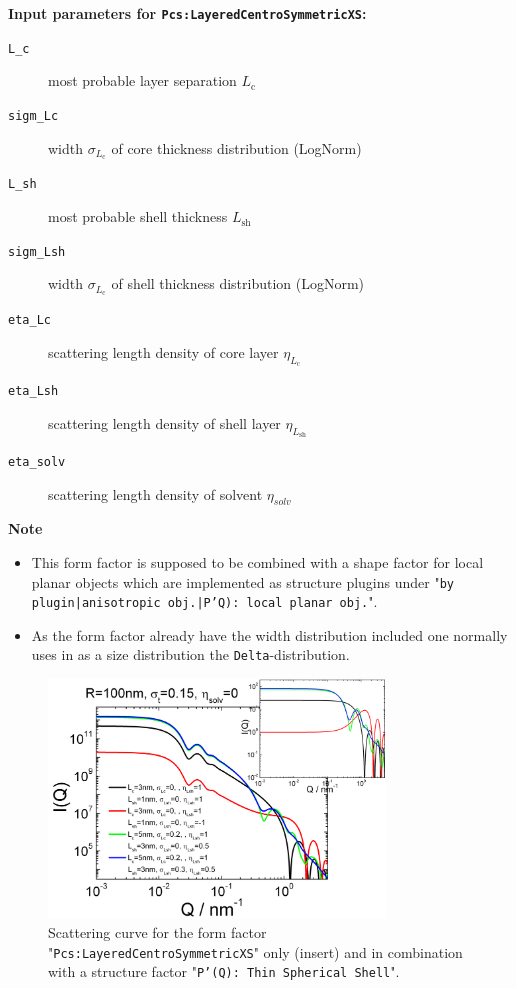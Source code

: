\noindent
\textbf{Input parameters for \texttt{Pcs:LayeredCentroSymmetricXS}:}
\begin{description}
    \item[\texttt{L\_c}] most probable layer separation $L_\textrm{c}$
    \item[\texttt{sigm\_Lc}] width $\sigma_{L_\textrm{c}}$ of core thickness distribution (LogNorm)
    \item[\texttt{L\_sh}] most probable shell thickness $L_\textrm{sh}$
    \item[\texttt{sigm\_Lsh}] width $\sigma_{L_\textrm{c}}$ of shell thickness distribution (LogNorm)
    \item[\texttt{eta\_Lc}] scattering length density of core layer $\eta_{L_\textrm{c}}$
    \item[\texttt{eta\_Lsh}] scattering length density of shell layer $\eta_{L_\textrm{sh}}$
    \item[\texttt{eta\_solv}] scattering length density of solvent $\eta_{solv}$
\end{description}

\noindent
\textbf{Note}
\begin{itemize}
  \item This form factor is supposed to be combined with a shape factor for
local planar objects which are implemented as structure  plugins
under "\texttt{by plugin|anisotropic obj.|P'Q): local planar
obj.}".
\item As the form factor already have the width distribution included one normally uses in \SASfit as a size distribution
the \texttt{Delta}-distribution.
\end{itemize}

\begin{figure}[htb]
\begin{center}
\includegraphics[width=0.8\textwidth,height=0.55\textwidth]{../images/form_factor/anisotropic/Pcs_planar2centrosymmIQ.png}
\end{center}
\caption{Scattering curve for the form factor "\texttt{Pcs:LayeredCentroSymmetricXS}" only (insert) and
in combination with a structure factor "\texttt{P'(Q): Thin Spherical Shell}".}
\label{fig:Pcs_planar2centrosymmIQ}
\end{figure}

